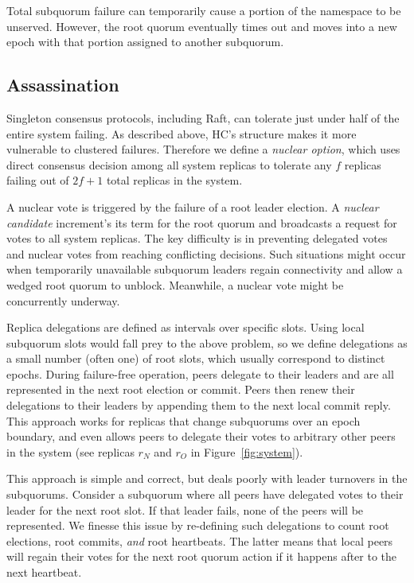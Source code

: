 \documentclass[10pt,conference]{IEEEtran}
\newcommand{\sub}{subquorum\xspace}
\newcommand{\subs}{subquorums\xspace}
\newcommand{\roo}{root quorum\xspace}
\begin{document}
Total \sub failure can temporarily cause a portion of the namespace to be unserved. However, the \roo
eventually times out and moves into a new epoch with that portion assigned to another
\sub.

\subsection{Assassination}
\label{section:assassination}

Singleton consensus protocols, including Raft, can tolerate just under half of the entire system
failing.
As described above, HC's structure makes it more vulnerable to clustered failures.
Therefore we define a \emph{nuclear option}, which uses direct consensus
decision among all system replicas to tolerate any $f$ replicas
failing out of $2f+1$ total replicas in the system.

A nuclear vote is triggered by the failure of a root leader election.
A \emph{nuclear candidate}
increment's its term for the \roo and broadcasts a request for votes to all
system replicas.
The key difficulty is in preventing delegated votes and
nuclear votes from reaching conflicting decisions.
Such situations might occur when temporarily unavailable \sub leaders regain connectivity
and allow a wedged \roo to unblock.
Meanwhile, a nuclear vote might be concurrently underway.

Replica delegations are defined as intervals over specific slots.
Using local \sub slots would fall prey to the above problem, so we define
delegations as a small number (often one) of root slots, which usually
correspond to distinct epochs.
During failure-free operation, peers delegate to their leaders and are all
represented in the next root election or commit.
Peers then renew their delegations to their leaders by appending them to the
next local commit reply.
This approach works for replicas that change \subs over an epoch
boundary, and even allows peers to delegate their votes to arbitrary other
peers in the system (see replicas $r_N$ and $r_O$ in Figure~\ref{fig:system}).

This approach is simple and correct, but deals poorly with leader turnovers in
the \subs.
Consider a \sub where all peers have delegated votes to their leader
for the next root slot.
If that leader fails, none of the peers will be represented.
We finesse this issue by re-defining such delegations to count
root elections, root commits, \emph{and} root heartbeats.
The latter means that local peers will regain their votes for the next \roo
action if it happens after to the next heartbeat.
\end{document}
